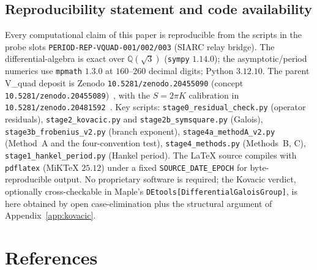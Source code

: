 \documentclass[11pt,reqno]{amsart}
\theoremstyle{plain}
\theoremstyle{definition}
\newcommand{\Qsqrt}{\mathbb{Q}(\sqrt3)}
\begin{document}
\subsection{Reproducibility statement and code availability}\label{app:repro}
Every computational claim of this paper is reproducible from the scripts in the probe slots
\texttt{PERIOD-REP-VQUAD-001/002/003} (SIARC relay bridge). The differential-algebra is exact over
$\Qsqrt$ (\texttt{sympy} $1.14.0$); the asymptotic/period numerics use \texttt{mpmath} $1.3.0$ at
$160$--$260$ decimal digits; Python $3.12.10$. The parent V\_quad deposit is Zenodo
\texttt{10.5281/zenodo.20455090} (concept \texttt{10.5281/zenodo.20455089})~\cite{Vquad}, with the
$S=2\pi K$ calibration in \texttt{10.5281/zenodo.20481592}~\cite{StokesNote}. Key scripts:
\texttt{stage0\_residual\_check.py} (operator residuals), \texttt{stage2\_kovacic.py} and
\texttt{stage2b\_symsquare.py} (Galois), \texttt{stage3b\_frobenius\_v2.py} (branch exponent),
\texttt{stage4a\_methodA\_v2.py} (Method~A and the four-convention test),
\texttt{stage4\_methods.py} (Methods~B, C), \texttt{stage1\_hankel\_period.py} (Hankel period).
The LaTeX source compiles with \texttt{pdflatex} (MiKTeX $25.12$) under a fixed
\texttt{SOURCE\_DATE\_EPOCH} for byte-reproducible output. No proprietary software is required;
the Kovacic verdict, optionally cross-checkable in Maple's
\texttt{DEtools[DifferentialGaloisGroup]}, is here obtained by open case-elimination plus the
structural argument of Appendix~\ref{app:kovacic}.

\section*{References}
\end{document}
